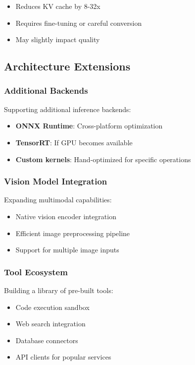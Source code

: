 \begin{itemize}
    \item Reduces KV cache by 8-32x
    \item Requires fine-tuning or careful conversion
    \item May slightly impact quality
\end{itemize}

\subsection{Architecture Extensions}

\subsubsection{Additional Backends}

Supporting additional inference backends:

\begin{itemize}
    \item \textbf{ONNX Runtime}: Cross-platform optimization
    \item \textbf{TensorRT}: If GPU becomes available
    \item \textbf{Custom kernels}: Hand-optimized for specific operations
\end{itemize}

\subsubsection{Vision Model Integration}

Expanding multimodal capabilities:

\begin{itemize}
    \item Native vision encoder integration
    \item Efficient image preprocessing pipeline
    \item Support for multiple image inputs
\end{itemize}

\subsubsection{Tool Ecosystem}

Building a library of pre-built tools:

\begin{itemize}
    \item Code execution sandbox
    \item Web search integration
    \item Database connectors
    \item API clients for popular services
\end{itemize}

